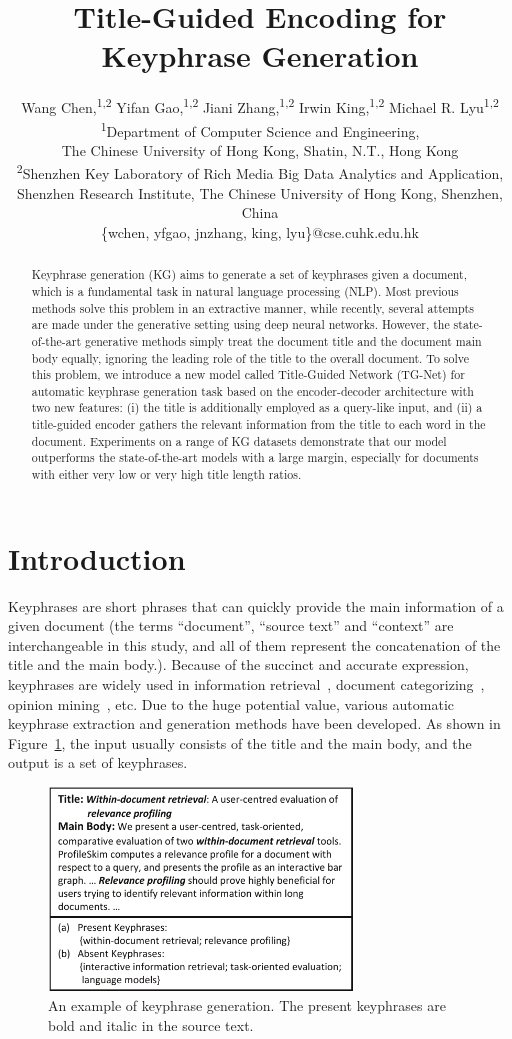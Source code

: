 \documentclass[letterpaper]{article} %
\title{Title-Guided Encoding for Keyphrase Generation}
\author{Wang Chen,\textsuperscript{1,2} Yifan Gao,\textsuperscript{1,2} Jiani Zhang,\textsuperscript{1,2} Irwin King,\textsuperscript{1,2} Michael R. Lyu\textsuperscript{1,2} \\
  \textsuperscript{1}Department of Computer Science and Engineering, \\
The Chinese University of Hong Kong, Shatin, N.T., Hong Kong \\
\textsuperscript{2}Shenzhen Key Laboratory of Rich Media Big Data Analytics and Application, \\
Shenzhen Research Institute, The Chinese University of Hong Kong, Shenzhen, China \\
  \{wchen, yfgao, jnzhang, king, lyu\}@cse.cuhk.edu.hk \\
  }
\begin{document}
\maketitle

\begin{abstract}
Keyphrase generation (KG) aims to generate a set of keyphrases given a document, which is a fundamental task in natural language processing (NLP). Most previous methods solve this problem in an extractive manner, while recently, several attempts are made under the generative setting using deep neural networks. However, the state-of-the-art generative methods simply treat the document title and the document main body equally, ignoring the leading role of the title to the overall document. To solve this problem, we introduce a new model called Title-Guided Network (TG-Net) for automatic keyphrase generation task based on the encoder-decoder architecture with two new features: (\textrm{i}) the title is additionally employed as a query-like input, and (\textrm{ii}) a title-guided encoder gathers the relevant information from the title to each word in the document. Experiments on a range of KG datasets demonstrate that our model outperforms the state-of-the-art models with a large margin, especially for documents with either very low or very high title length ratios.
\end{abstract}


\section{Introduction}
Keyphrases are short phrases that can quickly provide the main information of a given document (the terms ``document'', ``source text'' and ``context'' are interchangeable in this study, and all of them represent the concatenation of the title and the main body.). Because of the succinct and accurate expression, keyphrases are widely used in information retrieval~\cite{jones1999phrasier}, document categorizing~\cite{hulth2006study}, opinion mining~\cite{berend2011opinion}, etc. Due to the huge potential value, various automatic keyphrase extraction and generation methods have been developed. As shown in Figure~\ref{figure: keyphrase generation example}, the input usually consists of the title and the main body, and the output is a set of keyphrases.

\begin{figure}
\centering
\includegraphics[width=3.2in]{figures/PaperID3210_TGNet_intro_case_study_cmyk.pdf}
\caption{An example of keyphrase generation. The present keyphrases are bold and italic in the source text.}
\label{figure: keyphrase generation example}
\end{figure}
\end{document}

